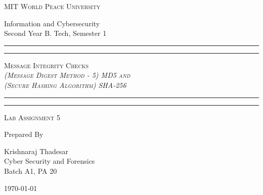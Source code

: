 \documentclass[11pt]{article}
\begin{document}
\begin{titlepage}
    \centering


    \huge\textsc{
        MIT World Peace University
    }\\

    \vspace{0.75\baselineskip} %

    \LARGE{
        Information and Cybersecurity\\
        Second Year B. Tech, Semester 1
    }

    \vfill %


    \rule{\textwidth}{1.6pt}\vspace*{-\baselineskip}\vspace*{2pt}
    \rule{\textwidth}{0.6pt}
    \vspace{0.75\baselineskip} %



    \huge{\textsc{
            Message Integrity Checks\\
            \textit{(Message Digest Method - 5) MD5 and \\ (Secure Hashing Algorithm) SHA-256}
        }} \\



    \vspace{0.5\baselineskip} %
    \rule{\textwidth}{0.6pt}\vspace*{-\baselineskip}\vspace*{2.8pt}
    \rule{\textwidth}{1.6pt}

    \vspace{1\baselineskip} %


    \LARGE\textsc{
        Lab Assignment 5
    } %
    \vfill


    Prepared By
    \vspace{0.5\baselineskip} %

    \Large{
        Krishnaraj Thadesar \\
        Cyber Security and Forensics\\
        Batch A1, PA 20
    }


    \vspace{0.5\baselineskip} %
    \today

\end{titlepage}
\end{document}
